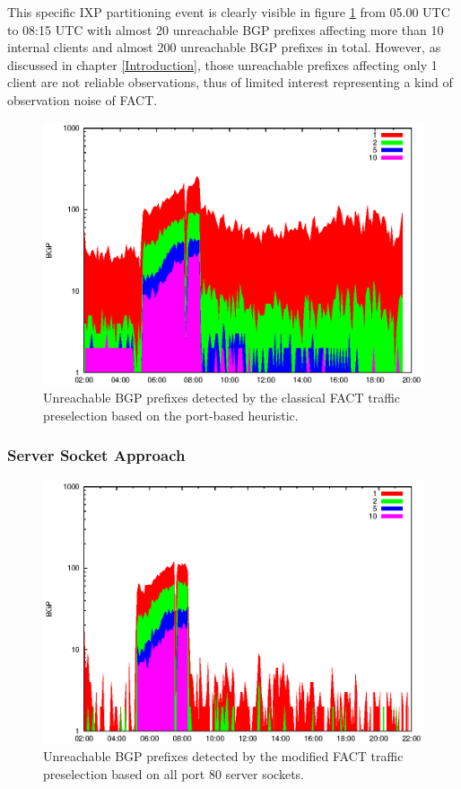 This specific IXP partitioning event is clearly visible in figure  \ref{fig:AMS_IX_FACT_REF} from 05.00 UTC to 08:15 UTC with almost 20 unreachable BGP prefixes affecting more than 10 internal clients and almost 200 unreachable BGP prefixes in total. However, as discussed in chapter \ref{Introduction}, those unreachable prefixes affecting only 1 client are not reliable observations, thus of limited interest representing a kind of observation noise of FACT.

\begin{figure}
	[hb] \centering 
	\includegraphics[width=\linewidth]{images/events/2010_03_25/bgp_log_port80_ref.eps}
	\caption{Unreachable BGP prefixes detected by the classical FACT traffic preselection based on the port-based heuristic.} 
	\label{fig:AMS_IX_FACT_REF} 
\end{figure}

\subsubsection{Server Socket Approach}
\begin{figure}
	[hb] \centering 
	\includegraphics[width=\linewidth]{images/events/2010_03_25/bgp_log_allPort80SES.eps}
	\caption{Unreachable BGP prefixes detected by the modified FACT traffic preselection based on all port 80 server sockets.} 
	\label{fig:AMS_IX_FACT_allSES80} 
\end{figure}


